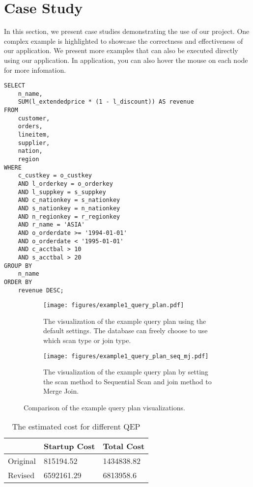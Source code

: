 \section{Case Study}
\label{sec:application}

In this section, we present case studies demonstrating the use of our project. One complex example is highlighted to showcase the correctness and effectiveness of our application. We present more examples that can also be executed directly using our application. In application, you can also hover the mouse on each node for more infomation.

\newpage

\begin{lstlisting}
SELECT
    n_name,
    SUM(l_extendedprice * (1 - l_discount)) AS revenue
FROM
    customer,
    orders,
    lineitem,
    supplier,
    nation,
    region
WHERE
    c_custkey = o_custkey
    AND l_orderkey = o_orderkey
    AND l_suppkey = s_suppkey
    AND c_nationkey = s_nationkey
    AND s_nationkey = n_nationkey
    AND n_regionkey = r_regionkey
    AND r_name = 'ASIA'
    AND o_orderdate >= '1994-01-01'
    AND o_orderdate < '1995-01-01'
    AND c_acctbal > 10
    AND s_acctbal > 20
GROUP BY
    n_name
ORDER BY
    revenue DESC;
\end{lstlisting}

\begin{figure}[ht]
    \centering
    \begin{subfigure}[b]{0.49\linewidth}
        \centering
        \texttt{[image: figures/example1\_query\_plan.pdf]}
        \caption{The visualization of the example query plan using the default settings. The database can freely choose to use which scan type or join type.}
        \label{fig:vis-example-default}
    \end{subfigure}
    \hfill
    \begin{subfigure}[b]{0.49\linewidth}
        \centering
        \texttt{[image: figures/example1\_query\_plan\_seq\_mj.pdf]}
        \caption{The visualization of the example query plan by setting the scan method to Sequential Scan and join method to Merge Join.}
        \label{fig:vis-example-ss-mj}
    \end{subfigure}
    \caption{Comparison of the example query plan visualizations.}
    \label{fig:vis-example-comparison}
\end{figure}

\begin{table}[h]
\centering
\begin{tabular}{lll}
\toprule
         & Startup Cost & Total Cost \\
\midrule
Original & 815194.52    & 1434838.82 \\
Revised  & 6592161.29   & 6813958.6 \\
\bottomrule
\end{tabular}
\label{tab:cost-comp}
\caption{The estimated cost for different QEP}
\end{table}

